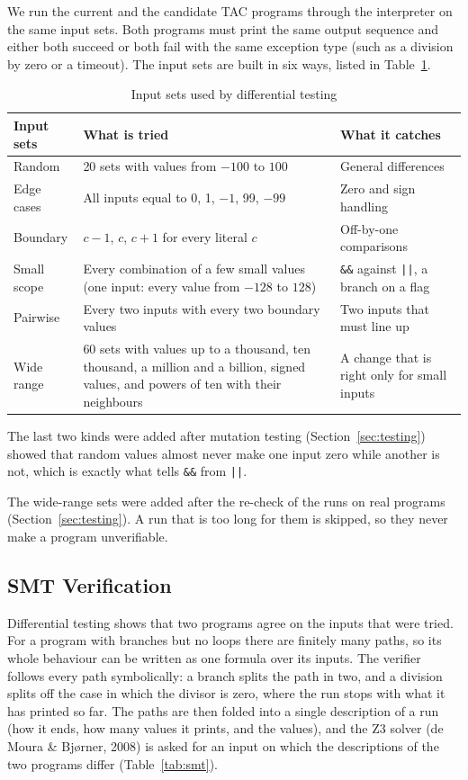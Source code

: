 \documentclass[12pt,a4paper]{report}
\begin{document}
We run the current and the candidate TAC programs through the interpreter on the same input sets. Both programs must print the same output sequence and either both succeed or both fail with the same exception type (such as a division by zero or a timeout). The input sets are built in six ways, listed in Table~\ref{tab:inputs}.

\begin{table}[H]
\centering
\caption{Input sets used by differential testing}
\label{tab:inputs}
\begin{tabularx}{\textwidth}{|l|X|l|}
\hline
\textbf{Input sets} & \textbf{What is tried} & \textbf{What it catches} \\
\hline
Random & 20 sets with values from $-100$ to $100$ & General differences \\
\hline
Edge cases & All inputs equal to 0, 1, $-1$, 99, $-99$ & Zero and sign handling \\
\hline
Boundary & $c-1$, $c$, $c+1$ for every literal $c$ & Off-by-one comparisons \\
\hline
Small scope & Every combination of a few small values (one input: every value from $-128$ to $128$) & \texttt{\&\&} against \texttt{||}, a branch on a flag \\
\hline
Pairwise & Every two inputs with every two boundary values & Two inputs that must line up \\
\hline
Wide range & 60 sets with values up to a thousand, ten thousand, a million and a billion, signed values, and powers of ten with their neighbours & A change that is right only for small inputs \\
\hline
\end{tabularx}
\end{table}

The last two kinds were added after mutation testing (Section~\ref{sec:testing}) showed that random values almost never make one input zero while another is not, which is exactly what tells \texttt{\&\&} from \texttt{||}.

The wide-range sets were added after the re-check of the runs on real programs (Section~\ref{sec:testing}). A run that is too long for them is skipped, so they never make a program unverifiable.

\subsection{SMT Verification}

Differential testing shows that two programs agree on the inputs that were tried. For a program with branches but no loops there are finitely many paths, so its whole behaviour can be written as one formula over its inputs. The verifier follows every path symbolically: a branch splits the path in two, and a division splits off the case in which the divisor is zero, where the run stops with what it has printed so far. The paths are then folded into a single description of a run (how it ends, how many values it prints, and the values), and the Z3 solver (de Moura \& Bj{\o}rner, 2008) is asked for an input on which the descriptions of the two programs differ (Table~\ref{tab:smt}).
\end{document}
